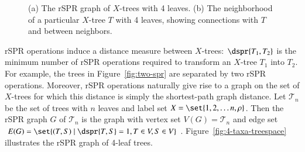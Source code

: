 \documentclass[]{elsarticle}
\let\MYoriglatexcaption\caption
\renewcommand{\caption}[2][\relax]{\MYoriglatexcaption[#2]{#2}}
\begin{document}
\begin{figure}
	\caption{(a) The rSPR graph of $X$-trees with 4 leaves. (b) The neighborhood of a particular $X$-tree $T$ with 4 leaves, showing connections with $T$ and between neighbors.}
\end{figure}

rSPR operations induce a distance measure between $X$-trees: $\dspr{T_1, T_2}$ is the minimum number of rSPR operations required to transform an $X$-tree $T_1$ into $T_2$.
For example, the trees in Figure~\ref{fig:two-spr} are separated by two rSPR operations.
Moreover, rSPR operations naturally give rise to a graph on the set of $X$-trees for which this distance is simply the shortest-path graph distance.
Let $\mathcal{T}_n$ be the set of trees with $n$ leaves and label set $X = \set{1, 2, \ldots n, \rho}$.
Then the rSPR graph $G$ of $\mathcal{T}_n$ is the graph with vertex set $V(G) = \mathcal{T}_n$ and edge set $E(G) = \set{(T,S) \mid \dspr{T,S} = 1, T \in V, S \in V}$.
Figure~\ref{fig:4-taxa-treespace} illustrates the rSPR graph of 4-leaf trees.
\end{document}
